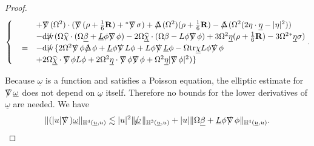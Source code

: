 \documentclass[11pt,reqno]{amsart}
\theoremstyle{definition}
\numberwithin{equation}{section}
\newcommand{\tr}{\mathrm{tr}}
\renewcommand{\H}{\mathbb{H}}
\def\betab{\underline{\beta}}
\def\chib{\underline{\chi}}
\def\chibh{\widehat{\underline{\chi}}}
\def\chih{\widehat{\chi}}
\def\etab{\underline{\eta}}
\def\Lb{\underline{L}}
\def\tr{\mathrm{tr}}
\def\omegab{\underline{\omega}}
\def\ub{\underline{u}}
\def\nablas{\mbox{$\nabla \mkern -13mu /$ }}
\def\Deltas{\mbox{$\Delta \mkern -13mu /$ }}
\def\divs{\mbox{$\mathrm{div} \mkern -13mu /$ }}
\def\omegabs{\mbox{$\omegab \mkern -13mu /$ }}
\def\ds{\mbox{$\nabla \mkern -13mu /$ }}
\begin{document}
\begin{proof}
\begin{align*}
\begin{cases}
&+\nablas(\Omega^2)\cdot(\ds(\rho+\frac{1}{6}\mathbf{R})+{}^*\ds\sigma)+\Deltas(\Omega^2)(\rho+\frac{1}{6}\mathbf{R})-\Deltas(\Omega^2(2\eta\cdot\etab-|\eta|^2))\\
&-\divs(\Omega\chih\cdot(\Omega\betab+\Lb\phi\nablas\phi)-2\Omega\chibh\cdot(\Omega\beta-L\phi\nablas\phi)+3\Omega^2\etab(\rho+\frac{1}{6}\mathbf{R})-3\Omega^2{}^*\etab\sigma)\\
\phantom{\Delta}=&-\divs\{2\Omega^2\ds\phi\Deltas\phi+\Lb\phi\nablas L\phi+L\phi\nablas\Lb\phi-\Omega\tr\chib L\phi\ds\phi\\
&+2\Omega\chibh\cdot\ds\phi L\phi+2\Omega^2\etab\cdot\nablas\phi\ds\phi+\Omega^2\etab|\ds\phi|^2)\}\end{cases}.
\end{align*}

Because $\omegab$ is a function and satisfies a Poisson equation, the elliptic estimate for $\nablas\omegab$ does not depend on $\omegab$ itself. Therefore no bounds for the lower derivatives of $\omegab$ are needed. We have
\begin{align}\label{elliptic-omegab}
\|(|u|\nablas)\omegab\|_{\H^4(\ub,u)}\lesssim|u|^2\|\omegabs\|_{\H^3(\ub,u)}+|u|\|\Omega\betab+\Lb\phi\nablas\phi\|_{\H^4(\ub,u)}.
\end{align}


\end{proof}
\end{document}
